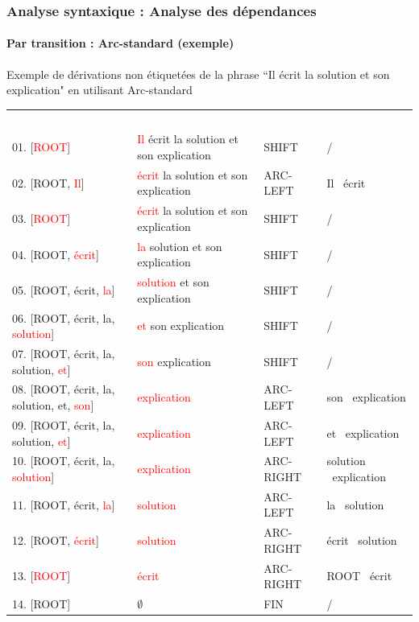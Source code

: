 \documentclass[xcolor=table]{beamer}
\begin{document}
\begin{frame}
\frametitle{Analyse syntaxique : Analyse des dépendances}
\framesubtitle{Par transition : Arc-standard (exemple)}

\begin{exampleblock}{Exemple de dérivations non étiquetées de la phrase ``Il écrit la solution et son explication" en utilisant Arc-standard}
	\centering\bfseries\fontsize{6}{10}\selectfont
	\begin{tabular}{llll}
		\rowcolor{darkblue}
		\textcolor{white}{nb. $\sigma$ (pile)} & \textcolor{white}{$\beta$ (tampon)} & \textcolor{white}{Action} & \textcolor{white}{Arc ajouté à A} \\
		01. [\textcolor{red}{ROOT}] & \textcolor{red}{Il} écrit la solution et son explication & SHIFT & / \\
		02. [ROOT, \textcolor{red}{Il}] & \textcolor{red}{écrit} la solution et son explication & ARC-LEFT & Il \textleftarrow\ écrit\\
		03. [\textcolor{red}{ROOT}] & \textcolor{red}{écrit} la solution et son explication & SHIFT & / \\
		04. [ROOT, \textcolor{red}{écrit}] & \textcolor{red}{la} solution et son explication & SHIFT & / \\
		05. [ROOT, écrit, \textcolor{red}{la}] & \textcolor{red}{solution} et son explication & SHIFT & / \\
		06. [ROOT, écrit, la, \textcolor{red}{solution}] & \textcolor{red}{et} son explication & SHIFT & / \\
		07. [ROOT, écrit, la, solution, \textcolor{red}{et}] & \textcolor{red}{son} explication & SHIFT & / \\
		08. [ROOT, écrit, la, solution, et, \textcolor{red}{son}] & \textcolor{red}{explication} & ARC-LEFT & son \textleftarrow\ explication\\
		09. [ROOT, écrit, la, solution, \textcolor{red}{et}] & \textcolor{red}{explication} & ARC-LEFT & et \textleftarrow\ explication\\
		10. [ROOT, écrit, la, \textcolor{red}{solution}] & \textcolor{red}{explication} & ARC-RIGHT & solution \textrightarrow\ explication\\
		11. [ROOT, écrit, \textcolor{red}{la}] & \textcolor{red}{solution} & ARC-LEFT & la \textleftarrow\ solution\\
		12. [ROOT, \textcolor{red}{écrit}] & \textcolor{red}{solution} & ARC-RIGHT & écrit \textrightarrow\ solution\\
		13. [\textcolor{red}{ROOT}] & \textcolor{red}{écrit} & ARC-RIGHT & ROOT \textrightarrow\ écrit\\
		14. [ROOT] & $\emptyset$ & FIN & / \\
	\end{tabular}
\end{exampleblock}


\end{frame}
\end{document}

